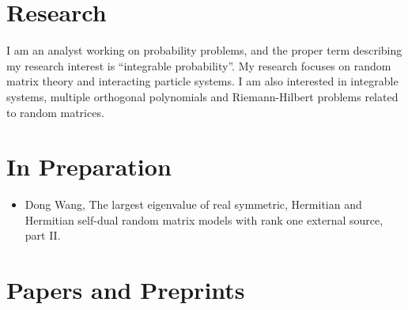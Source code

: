 \documentclass[12pt,a4paper]{article}
\begin{document}
\section*{Research}

I am an analyst working on probability problems, and the proper term describing my research interest is ``integrable probability''. My research focuses on random matrix theory and interacting particle systems. I am also interested in integrable systems, multiple orthogonal polynomials and Riemann-Hilbert problems related to random matrices.

\section*{In Preparation}

\begin{itemize}
\item
  Dong Wang, The largest eigenvalue of real symmetric, Hermitian and Hermitian self-dual random matrix models with rank one external source, part II.
\end{itemize}

\section*{Papers and Preprints}
\end{document}
